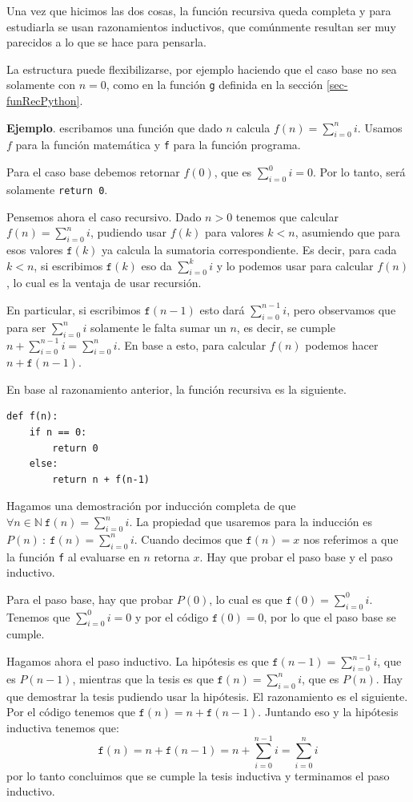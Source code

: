 \documentclass[a4paper, 12pt]{report}
\newcommand{\N}{\mathbb{N}}
\theoremstyle{definition}
\begin{document}
Una vez que hicimos las dos cosas, la función recursiva queda completa y para estudiarla se usan razonamientos inductivos, que comúnmente resultan ser muy parecidos a lo que se hace para pensarla.

La estructura puede flexibilizarse, por ejemplo haciendo que el caso base no sea solamente con $n=0$, como en la función {\tt g} definida en la sección \ref{sec-funRecPython}.

\vspace{0.5em}
{\bf Ejemplo}. escribamos una función que dado $n$ calcula $f(n)=\sum_{i=0}^ni$. Usamos $f$ para la función matemática y {\tt f} para la función programa.

Para el caso base debemos retornar $f(0)$, que es $\sum_{i=0}^0i=0$. Por lo tanto, será solamente {\tt return 0}.

Pensemos ahora el caso recursivo. Dado $n>0$ tenemos que calcular $f(n)=\sum_{i=0}^ni$, pudiendo usar $f(k)$ para valores $k<n$, asumiendo que para esos valores $\mathtt{f}(k)$ ya calcula la sumatoria correspondiente. Es decir, para cada $k<n$, si escribimos $\mathtt{f}(k)$ eso da $\sum_{i=0}^ki$ y lo podemos usar para calcular $f(n)$, lo cual es la ventaja de usar recursión.

En particular, si escribimos $\mathtt{f}(n-1)$ esto dará $\sum_{i=0}^{n-1}i$, pero observamos que para ser $\sum_{i=0}^{n}i$ solamente le falta sumar un $n$, es decir,  se cumple $n+\sum_{i=0}^{n-1}i=\sum_{i=0}^{n}i$. En base a esto, para calcular $f(n)$ podemos hacer $n + \mathtt{f}(n-1)$.

En base al razonamiento anterior, la función recursiva es la siguiente.
\begin{verbatim}
def f(n):
    if n == 0:
        return 0
    else:
        return n + f(n-1)
\end{verbatim}
Hagamos una demostración por inducción completa de que $\forall n\in\N ~\mathtt{f}(n)=\sum_{i=0}^ni$. La propiedad que usaremos para la inducción es $P(n)~:~\mathtt{f}(n)=\sum_{i=0}^ni$. Cuando decimos que $\mathtt{f}(n)=x$ nos referimos a que la función {\tt f} al evaluarse en $n$ retorna $x$. Hay que probar el paso base y el paso inductivo.

Para el paso base, hay que probar $P(0)$, lo cual es que $\mathtt{f}(0)=\sum_{i=0}^0i$. Tenemos que $\sum_{i=0}^0i=0$ y por el código $\mathtt{f}(0)=0$, por lo que el paso base se cumple.

Hagamos ahora el paso inductivo. La hipótesis es que $\mathtt{f}(n-1)=\sum_{i=0}^{n-1}i$, que es $P(n-1)$, mientras que la tesis es que $\mathtt{f}(n)=\sum_{i=0}^{n}i$, que es $P(n)$. Hay que demostrar la tesis pudiendo usar la hipótesis. El razonamiento es el siguiente. Por el código tenemos que $\mathtt{f}(n) = n + \mathtt{f}(n-1)$. Juntando eso y la hipótesis inductiva tenemos que:
$$\mathtt{f}(n) = n + \mathtt{f}(n-1) = n + \sum_{i=0}^{n-1}i=\sum_{i=0}^{n}i
$$
por lo tanto concluimos que se cumple la tesis inductiva y terminamos el paso inductivo.
\end{document}
